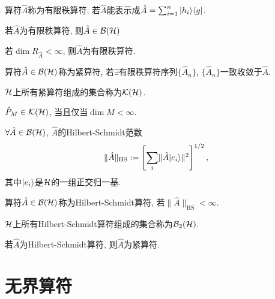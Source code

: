 \begin{definition}
    算符$\hat{A}$称为有限秩算符, 若$\hat{A}$能表示成$\hat{A}=\sum_{i=1}^n{|h_i\rangle\langle g|}$.
\end{definition}
\begin{theorem}
    若$\hat{A}$为有限秩算符, 则$\hat{A}\in\mathcal{B}(\mathcal{H})$
\end{theorem}
\begin{theorem}
    若$\dim R_{\hat{A}}<\infty$, 则$\hat{A}$为有限秩算符.
\end{theorem}
\begin{definition}
    算符$\hat{A}\in\mathcal{B}(\mathcal{H})$称为紧算符, 若$\exists\text{有限秩算符序列}\{\hat{A}_n\}$, $\{\hat{A}_n\}$一致收敛于$\hat{A}$.
\end{definition}
\begin{definition}
    $\mathcal{H}$上所有紧算符组成的集合称为$\mathcal{K}(\mathcal{H})$.
\end{definition}
\begin{theorem}
    $\hat{P}_M\in\mathcal{K}(\mathcal{H})$, 当且仅当$\dim M<\infty$.
\end{theorem}
\begin{definition}
    $\forall\hat{A}\in\mathcal{B}(\mathcal{H})$, $\hat{A}$的Hilbert-Schmidt范数
    \begin{equation*}
        \lVert\hat{A}\rVert_\text{HS}:=\left[\sum_i\lVert\hat{A}|e_i\rangle\rVert^2\right]^{1/2},
    \end{equation*}
    其中${|e_i\rangle}$是$\mathcal{H}$的一组正交归一基.
\end{definition}
\begin{definition}
    算符$\hat{A}\in\mathcal{B}(\mathcal{H})$称为Hilbert-Schmidt算符, 若$\lVert\hat{A}\rVert_\text{HS}<\infty$.
\end{definition}
\begin{definition}
    $\mathcal{H}$上所有Hilbert-Schmidt算符组成的集合称为$\mathcal{B}_2(\mathcal{H})$.
\end{definition}
\begin{theorem}
    若$\hat{A}$为Hilbert-Schmidt算符, 则$\hat{A}$为紧算符.
\end{theorem}

\section{无界算符}

